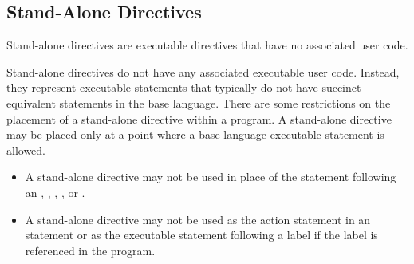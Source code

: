 \subsection{Stand-Alone Directives}
\label{subsec:Stand-Alone Directives}

\summary
Stand-alone directives are executable directives that have no associated user code.

\descr
Stand-alone directives do not have any associated executable user code. Instead, 
they represent executable statements that typically do not have succinct equivalent 
statements in the base language. There are some restrictions on the placement of a 
stand-alone directive within a program. A stand-alone directive may be placed only 
at a point where a base language executable statement is allowed.

\restrictions
\begin{ccppspecific}
\begin{itemize}
\item A stand-alone directive may not be used in place of the statement following
      an , , , , or .
\end{itemize}
\end{ccppspecific}

\begin{fortranspecific}
\begin{itemize}
\item A stand-alone directive may not be used as the action statement in an 
       statement or as the executable statement following a label 
      if the label is referenced in the program.
\end{itemize}
\end{fortranspecific}



